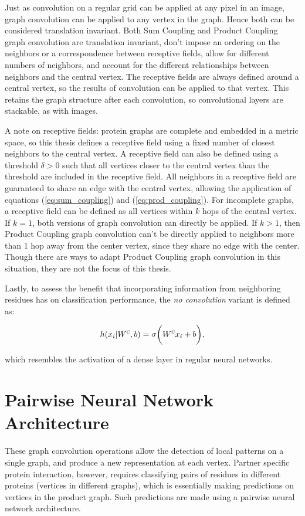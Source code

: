 Just as convolution on a regular grid can be applied at any pixel in an image, graph convolution can be applied to any vertex in the graph.
Hence both can be considered translation invariant.
Both Sum Coupling and Product Coupling graph convolution are translation invariant, don't impose an ordering on the neighbors or a correspondence between receptive fields, allow for different numbers of neighbors, and account for the different relationships between neighbors and the central vertex. 
The receptive fields are always defined around a central vertex, so the results of convolution can be applied to that vertex.
This retains the graph structure after each convolution, so convolutional layers are stackable, as with images.

A note on receptive fields: protein graphs are complete and embedded in a metric space, so this thesis defines a receptive field using a fixed number of closest neighbors to the central vertex.
A receptive field can also be defined using a threshold $\delta>0$ such that all vertices closer to the central vertex than the threshold are included in the receptive field.
All neighbors in a receptive field are guaranteed to share an edge with the central vertex, allowing the application of equations (\ref{eq:sum_coupling}) and (\ref{eq:prod_coupling}).
For incomplete graphs, a receptive field can be defined as all vertices within $k$ hops of the central vertex. 
If $k=1$, both versions of graph convolution can directly be applied.
If $k>1$, then Product Coupling graph convolution can't be directly applied to neighbors more than 1 hop away from the center vertex, since they share no edge with the center. 
Though there are ways to adapt Product Coupling graph convolution in this situation, they are not the focus of this thesis.

Lastly, to assess the benefit that incorporating information from neighboring residues has on classification performance, the \emph{no convolution} variant is defined as:

\begin{equation}
h(x_i | W^\textsc{c}, b)= \sigma \bigg( W^{\textsc{c}} x_i + b \bigg),
\label{eq:no_conv}
\end{equation}

\noindent
which resembles the activation of a dense layer in regular neural networks.


\section{Pairwise Neural Network Architecture}
These graph convolution operations allow the detection of local patterns on a single graph, and produce a new representation at each vertex.
Partner specific protein interaction, however, requires classifying pairs of residues in different proteins (vertices in different graphs), which is essentially making predictions on vertices in the product graph. 
Such predictions are made using a pairwise neural network architecture.

